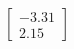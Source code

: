 \documentclass[preview]{standalone}
\begin{document}
\begin{align*}
\begin{bmatrix} -3.31 \\ 2.15 \end{bmatrix}
\end{align*}
\end{document}

